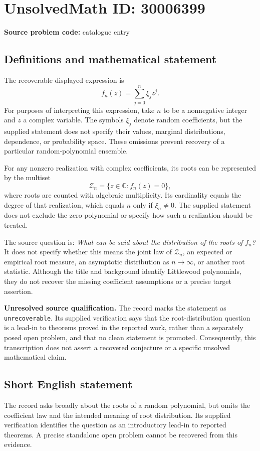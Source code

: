\documentclass[11pt]{article}
\newcommand{\C}{\mathbb{C}}
\begin{document}
\section*{UnsolvedMath ID: 30006399}
\textbf{Source problem code:} catalogue entry
\subsection{Definitions and mathematical statement}
The recoverable displayed expression is
\[
f_n(z)=\sum_{j=0}^{n}\xi_j z^j.
\]
For purposes of interpreting this expression, take \(n\) to be a nonnegative integer and \(z\) a complex variable. The symbols \(\xi_j\) denote random coefficients, but the supplied statement does not specify their values, marginal distributions, dependence, or probability space. These omissions prevent recovery of a particular random-polynomial ensemble.

For any nonzero realization with complex coefficients, its roots can be represented by the multiset
\[
\mathcal Z_n=\{z\in\C:f_n(z)=0\},
\]
where roots are counted with algebraic multiplicity. Its cardinality equals the degree of that realization, which equals \(n\) only if \(\xi_n\ne0\). The supplied statement does not exclude the zero polynomial or specify how such a realization should be treated.

The source question is: \emph{What can be said about the distribution of the roots of \(f_n\)?} It does not specify whether this means the joint law of \(\mathcal Z_n\), an expected or empirical root measure, an asymptotic distribution as \(n\to\infty\), or another root statistic. Although the title and background identify Littlewood polynomials, they do not recover the missing coefficient assumptions or a precise target assertion.

\textbf{Unresolved source qualification.} The record marks the statement as \texttt{unrecoverable}. Its supplied verification says that the root-distribution question is a lead-in to theorems proved in the reported work, rather than a separately posed open problem, and that no clean statement is promoted. Consequently, this transcription does not assert a recovered conjecture or a specific unsolved mathematical claim.
\subsection{Short English statement}
The record asks broadly about the roots of a random polynomial, but omits the coefficient law and the intended meaning of root distribution. Its supplied verification identifies the question as an introductory lead-in to reported theorems. A precise standalone open problem cannot be recovered from this evidence.
\end{document}
